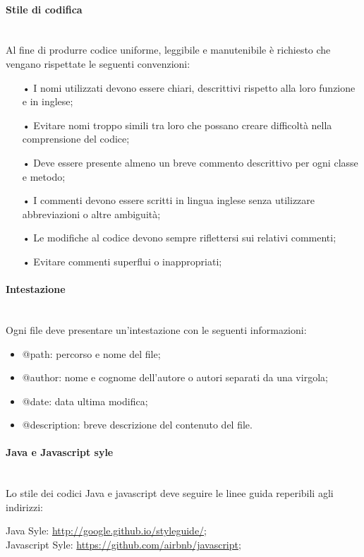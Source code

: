 \paragraph{Stile di codifica}\mbox{}\\
Al fine di produrre codice uniforme, leggibile e manutenibile è richiesto che vengano rispettate
le seguenti convenzioni:
\begin{itemize}
\item[•] I nomi utilizzati devono essere chiari, descrittivi rispetto alla loro funzione e in inglese;
\item[•] Evitare nomi troppo simili tra loro che possano creare difficoltà nella comprensione del codice;
\item[•] Deve essere presente almeno un breve commento descrittivo per ogni classe e metodo;
\item[•] I commenti devono essere scritti in lingua inglese senza utilizzare abbreviazioni o altre ambiguità;
\item[•] Le modifiche al codice devono sempre riflettersi sui relativi commenti;
\item[•] Evitare commenti superflui o  inappropriati;
\end{itemize}

\paragraph{Intestazione}\mbox{}\\
Ogni file deve presentare un'intestazione con le seguenti informazioni:
\begin{itemize}
\item @path: percorso e nome del file;
\item @author: nome e cognome dell'autore o autori separati da una virgola;
\item @date: data ultima modifica;
\item @description: breve descrizione del contenuto del file.
\end{itemize}


\paragraph{Java e Javascript syle}\mbox{}\\
Lo stile dei codici Java e javascript deve seguire le linee guida reperibili agli indirizzi:\\
\begin{center}
Java Syle: \url{http://google.github.io/styleguide/};\\
Javascript Syle: \url{https://github.com/airbnb/javascript};
\end{center}

